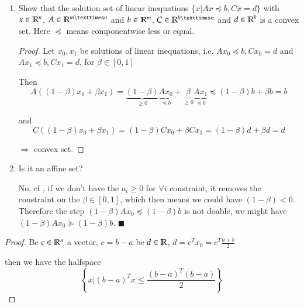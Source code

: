 \begin{enumerate}
    \questioncolor
    \item Show that the solution set of linear inequations $\{x | Ax \preceq b, Cx = d\}$ with $x \in \mathbb{R}^n$, $A \in \R^{m×n}$ and $b \in \mathbb{R}^m$, $C \in \R^{k×n}$ and $d \in \mathbb{R}^k$ is a convex set. Here $\preceq$ means componentwise less or equal. \normalcolor

    \begin{proof}
        Let $x_0, x_1$ be solutions of linear inequations, i.e. $A x_0 \preceq b, C x_0 = d$ and $A x_1 \preceq b, C x_1 = d$, for $\beta \in [0, 1]$

        Then
        \begin{equation}\label{eq:eq1}
            A((1-\beta)x_0 + \beta x_1) = \underbrace{(1-\beta)}_\text{$\ge 0$} \underbrace{A x_0}_\text{$\preceq b$} + \underbrace{\beta}_\text{$\ge 0$} \underbrace{A x_1}_\text{$\preceq b$} \preceq (1-\beta) b + \beta b = b
        \end{equation}

        and $$C((1-\beta) x_0 + \beta x_1) = (1-\beta) C x_0 + \beta C x_1 = (1-\beta) d + \beta d = d$$

        $\Rightarrow$ convex set.
    \end{proof}



    \questioncolor
    \item Is it an affine set? \normalcolor

    No, cf , if we don't have the $a_i \ge 0$ for $\forall i$ constraint, it removes the constraint on the $\beta \in [0,1]$, which then means we could have $(1-\beta) < 0$. Therefore the step $(1-\beta)Ax_0 \preceq (1-\beta)b$ is not doable, we might have $(1-\beta)Ax_0 \succeq (1-\beta)b$. \hfill $\blacksquare$
\end{enumerate}




\pagebreak
{}


\begin{proof}
Be $c \in \mathbb{R}^n$ a vector, $c = b - a$ be $d \in \mathbb{R}$, $d=c^T x_0 = c^T \frac{a+b}{2}$

then we have the halfspace $$\left\{x \bigg| (b-a)^T x \le \frac{(b-a)^T(b-a)}{2}\right\} $$
\end{proof}

